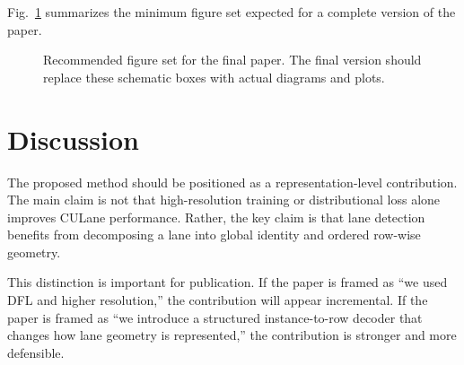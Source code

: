 \documentclass[conference]{IEEEtran}
\begin{document}
Fig.~\ref{fig:requiredfigs} summarizes the minimum figure set expected for a complete version of the paper.

\begin{figure}[t]
\centering
{}
\caption{Recommended figure set for the final paper. The final version should replace these schematic boxes with actual diagrams and plots.}
\label{fig:requiredfigs}
\end{figure}

\section{Discussion}

The proposed method should be positioned as a representation-level contribution. The main claim is not that high-resolution training or distributional loss alone improves CULane performance. Rather, the key claim is that lane detection benefits from decomposing a lane into global identity and ordered row-wise geometry.

This distinction is important for publication. If the paper is framed as ``we used DFL and higher resolution,'' the contribution will appear incremental. If the paper is framed as ``we introduce a structured instance-to-row decoder that changes how lane geometry is represented,'' the contribution is stronger and more defensible.
\end{document}
